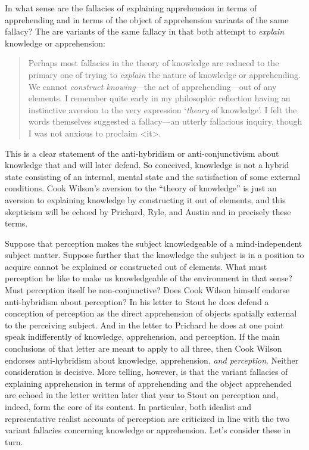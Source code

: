 In what sense are the fallacies of explaining apprehension in terms of apprehending and in terms of the object of apprehension variants of the same fallacy? The are variants of the same fallacy in that both attempt to \emph{explain} knowledge or apprehension:
\begin{quote}
	Perhaps most fallacies in the theory of knowledge are reduced to the primary one of trying to \emph{explain} the nature of knowledge or apprehending. We cannot \emph{construct knowing}---the act of apprehending---out of any elements. I remember quite early in my philosophic reflection having an instinctive aversion to the very expression `\emph{theory} of knowledge'. I felt the words themselves suggested a fallacy---an utterly fallacious inquiry, though I was not anxious to proclaim <it>. \citep[803]{Cook-Wilson:1926sf}
\end{quote}
This is a clear statement of the anti-hybridism or anti-conjunctivism about knowledge that \citet{McDowell:1982kx} and \citet{Williamson:2000lr} will later defend. So conceived, knowledge is not a hybrid state consisting of an internal, mental state and the satisfaction of some external conditions. Cook Wilson's aversion to the ``theory of knowledge'' is just an aversion to explaining knowledge by constructing it out of elements, and this skepticism will be echoed by Prichard, Ryle, and Austin and in precisely these terms.

Suppose that perception makes the subject knowledgeable of a mind-independent subject matter. Suppose further that the knowledge the subject is in a position to acquire cannot be explained or constructed out of elements. What must perception be like to make us knowledgeable of the environment in that sense? Must perception itself be non-conjunctive? Does Cook Wilson himself endorse anti-hybridism about perception? In his letter to Stout he does defend a conception of perception as the direct apprehension of objects spatially external to the perceiving subject. And in the letter to Prichard he does at one point speak indifferently of knowledge, apprehension, and perception. If the main conclusions of that letter are meant to apply to all three, then Cook Wilson endorses anti-hybridism about knowledge, apprehension, \emph{and perception}. Neither consideration is decisive. More telling, however, is that the variant fallacies of explaining apprehension in terms of apprehending and the object apprehended are echoed in the letter written later that year to Stout on perception and, indeed, form the core of its content. In particular, both idealist and representative realist accounts of perception are criticized in line with the two variant fallacies concerning knowledge or apprehension. Let's consider these in turn.

